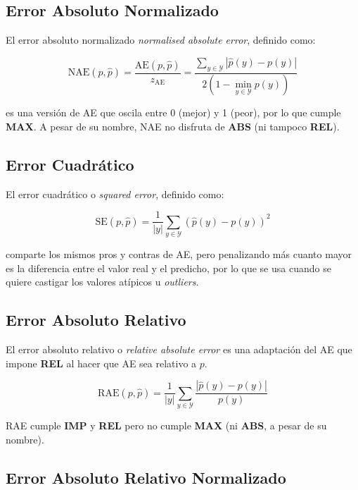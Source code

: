 \subsection{Error Absoluto Normalizado}

El error absoluto normalizado {\it normalised absolute error}, definido como:

\begin{equation}
    {\text{NAE}(p, \hat p)} = \frac{\text{AE}(p, \hat p)}{z_{\text{AE}}} = \frac{\sum _{y\in {\mathcal {Y}}}{|\hat p(y) - p(y)|}}{2(1-\displaystyle \min_{y\in {\mathcal {Y}}}p(y))}
\end{equation}

es una versión de AE que oscila entre 0 (mejor) y 1 (peor), por lo que cumple
{\bf MAX}. A pesar de su nombre, NAE no disfruta de {\bf ABS} (ni tampoco {\bf
REL}).

\subsection{Error Cuadrático}

El error cuadrático o {\it squared error}, definido como:

\begin{equation}
    {\text{SE}(p, \hat p)} = \frac{1}{|y|}\sum _{y\in {\mathcal {Y}}}{{(\hat p(y) - p(y))}^2}
\end{equation}

comparte los mismos pros y contras de AE, pero penalizando más cuanto mayor es
la diferencia entre el valor real y el predicho, por lo que se usa cuando se
quiere castigar los valores atípicos u {\it outliers}.

\subsection{Error Absoluto Relativo}

El error absoluto relativo o {\it relative absolute error\/} es una adaptación
del AE que impone {\bf REL} al hacer que AE sea relativo a $p$.

\begin{equation}
    {\text{RAE}(p, \hat p)} = \frac{1}{|y|}\sum _{y\in {\mathcal {Y}}}{\frac{|\hat p(y) - p(y)|}{p(y)}}
\end{equation}

RAE cumple {\bf IMP} y {\bf REL} pero no cumple {\bf MAX} (ni {\bf ABS}, a pesar
de su nombre).

\subsection{Error Absoluto Relativo Normalizado}

